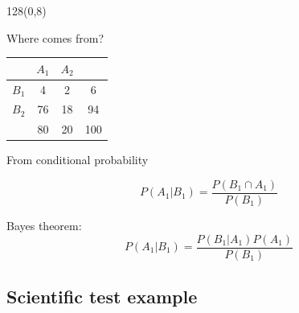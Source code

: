 \documentclass[shownotes]{beamer}
\begin{document}
\begin{frame}
\begin{textblock}{128}(0,8)
\begin{center}
 \Large Where comes from? 
\end{center}
\end{textblock}
\vspace{0.75cm}


\begin{table}[H]
\begin{tabular}{c|c|c|c}
 & $A_1$ & $A_2$ &  \\ \hline
 $B_1$& 4 & 2 & 6 \\ \hline
 $B_2$& 76 & 18 & 94\\ \hline
 & 80 & 20 & 100
\end{tabular}
\end{table}

\begin{center}
\large From conditional probability
\end{center}

\pause

\begin{equation*}
 P(A_1|B_1) = \frac{P(B_1 \cap A_1)}{P(B_1)}
\end{equation*}

\pause 

\begin{mdframed}
Bayes theorem:
\begin{equation}
  P(A_1|B_1) = \frac{P(B_1|A_1)P(A_1)}{P(B_1)}
\end{equation}
\end{mdframed}

\end{frame}

\subsection{Scientific test example}
\end{document}
